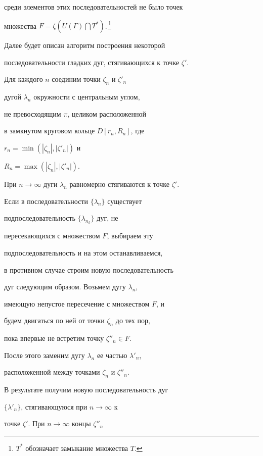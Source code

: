 \begin{pf}
среди элементов этих последовательностей не было точек


множества $F=\zeta(\Dot{U}(\Gamma)


\bigcap T^{*})$.\,\footnote{$T^{*}$ обозначает замыкание множества $T$.}





Далее будет описан алгоритм построения некоторой 


последовательности гладких дуг, стягивающихся к точке $\zeta'$.





Для каждого $n$ соединим точки $\zeta_{n}$ и $\zeta'_{n}$


дугой $\lambda_{n}$ окружности с центральным углом, 


не превосходящим $\pi$, целиком расположенной


в замкнутом круговом кольце $D[r_{n},R_n]$, где


$r_{n}=\min(|\zeta_{n}|, |\zeta'_{n}|)$ и 


$R_{n}=\max(|\zeta_{n}|, |\zeta'_{n}|)$. 


При $n\to\infty$ дуги $\lambda_{n}$ равномерно стягиваются к точке $\zeta'$.


Если в последовательности $\{\lambda_{n}\}$ существует


подпоследовательность $\{\lambda_{n_{k}}\}$ дуг, не


пересекающихся с множеством $F$, выбираем эту


подпоследовательность и на этом останавливаемся,


в противном случае строим новую последовательность


дуг следующим образом. Возьмем дугу $\lambda_{n}$,


имеющую непустое пересечение с множеством $F$, и 


будем двигаться по ней от точки $\zeta_{n}$ до тех пор, 


пока впервые не встретим точку $\zeta''_{n}\in F$.


После этого заменим дугу $\lambda_{n}$ ее частью $\lambda'_{n}$,


расположенной между точками $\zeta_{n}$ и $\zeta''_{n}$.


В результате получим новую последовательность дуг


$\{\lambda'_{n}\}$, стягивающуюся при $n\to\infty$ к


точке $\zeta'$. При $n\to\infty$ концы $\zeta''_{n}$



\end{pf}
